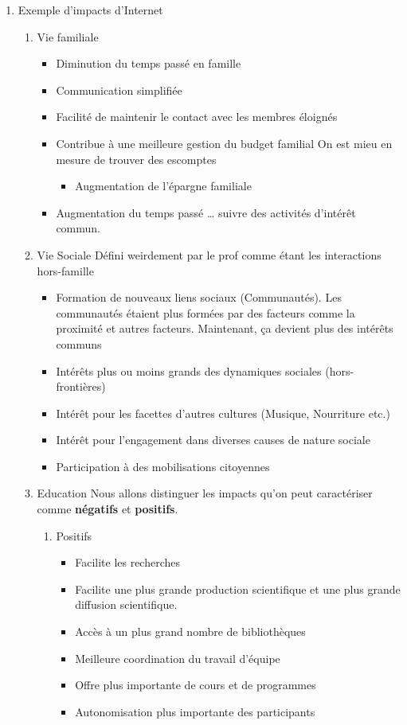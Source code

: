 \documentclass[11pt]{article}
\begin{document}
\begin{enumerate}
\item Exemple d'impacts d'Internet
\label{sec:org5568123}
\begin{enumerate}
\item Vie familiale
\label{sec:orgc371f53}
\begin{itemize}
\item Diminution du temps passé en famille
\item Communication simplifiée
\item Facilité de maintenir le contact avec les membres éloignés
\item Contribue à une meilleure gestion du budget familial
On est mieu en mesure de trouver des escomptes
\begin{itemize}
\item Augmentation de l'épargne familiale
\end{itemize}
\item Augmentation du temps passé \ldots{} suivre des activités d'intérêt commun.
\end{itemize}
\item Vie Sociale
\label{sec:org5f4a99b}
Défini weirdement par le prof comme étant les interactions hors-famille
\begin{itemize}
\item Formation de nouveaux liens sociaux (Communautés).
Les communautés étaient plus formées par des facteurs comme la proximité et
autres facteurs.  Maintenant, ça devient plus des intérêts communs
\item Intérêts plus ou moins grands des dynamiques sociales (hors-frontières)
\item Intérêt pour les facettes d'autres cultures (Musique, Nourriture etc.)
\item Intérêt pour l'engagement dans diverses causes de nature sociale
\item Participation à des mobilisations citoyennes
\end{itemize}
\item Education
\label{sec:org0c999cf}
Nous allons distinguer les impacts qu'on peut caractériser comme \textbf{négatifs} et
\textbf{positifs}.

\begin{enumerate}
\item Positifs
\label{sec:org0343139}
\begin{itemize}
\item Facilite les recherches
\item Facilite une plus grande production scientifique et une plus grande diffusion scientifique.
\item Accès à un plus grand nombre de bibliothèques
\item Meilleure coordination du travail d'équipe
\item Offre plus importante de cours et de programmes
\item Autonomisation plus importante des participants
\end{itemize}


\end{enumerate}
\end{enumerate}
\end{enumerate}
\end{document}
